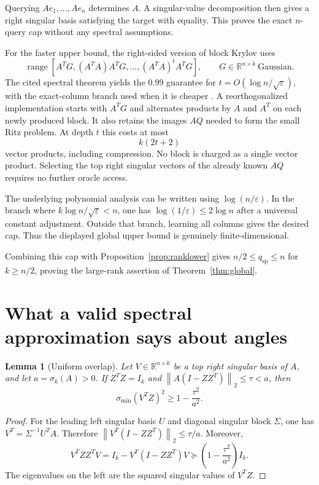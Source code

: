\documentclass[11pt]{article}
\numberwithin{equation}{section}
\newtheorem{lemma}[theorem]{Lemma}
\theoremstyle{definition}
\newcommand{\R}{\mathbb R}
\newcommand{\norm}[1]{\left\lVert#1\right\rVert}
\newcommand{\range}{\operatorname{range}}
\newcommand{\qsp}{q_{\mathrm{sp}}}
\newcommand{\eps}{\varepsilon}
\begin{document}
Querying $Ae_1,\ldots,Ae_n$ determines $A$. A singular-value decomposition
then gives a right singular basis satisfying the target with equality.
This proves the exact $n$-query cap without any spectral assumptions.

For the faster upper bound, the right-sided version of block Krylov uses
\[
 \range\!\left[A^TG,(A^TA)A^TG,\ldots,(A^TA)^tA^TG\right],
 \qquad G\in\R^{n\times k}\ \text{Gaussian}.
\]
The cited spectral theorem yields the $0.99$ guarantee for
$t=O(\log n/\sqrt\eps)$, with the exact-column branch used when it is
cheaper \cite{MM15}. A reorthogonalized implementation starts with $A^TG$
and alternates products by $A$ and $A^T$ on each newly produced block.
It also retains the images $AQ$ needed to form the small Ritz problem.
At depth $t$ this costs at most
\begin{equation}
 k(2t+2)
 \label{eq:uppercount}
\end{equation}
vector products, including compression. No block is charged as a single
vector product. Selecting the top right singular vectors of the already
known $AQ$ requires no further oracle access.

The underlying polynomial analysis can be written using
$\log(n/\eps)$. In the branch where $k\log n/\sqrt\eps<n$, one has
$\log(1/\eps)\le2\log n$ after a universal constant adjustment.
Outside that branch, learning all columns gives the desired cap.
Thus the displayed global upper bound is genuinely finite-dimensional.

Combining this cap with Proposition~\ref{prop:ranklower} gives
$n/2\le\qsp\le n$ for $k\ge n/2$, proving the large-rank assertion of
Theorem~\ref{thm:global}.

\section{What a valid spectral approximation says about angles}
\label{sec:angles}

\begin{lemma}[Uniform overlap]
\label{lem:angle}
Let $V\in\R^{n\times k}$ be a top right singular basis of $A$, and let
$a=\sigma_k(A)>0$. If $Z^TZ=I_k$ and
$\norm{A(I-ZZ^T)}_2\le\tau<a$, then
\begin{equation}
 \sigma_{\min}(V^TZ)^2\ge1-\frac{\tau^2}{a^2}.
 \label{eq:angle}
\end{equation}
\end{lemma}
\begin{proof}
For the leading left singular basis $U$ and diagonal singular block
$\Sigma$, one has $V^T=\Sigma^{-1}U^TA$. Therefore
$\norm{V^T(I-ZZ^T)}_2\le\tau/a$. Moreover,
\[
 V^TZZ^TV=I_k-V^T(I-ZZ^T)V
 \succeq\left(1-\frac{\tau^2}{a^2}\right)I_k.
\]
The eigenvalues on the left are the squared singular values of $V^TZ$.
\end{proof}
\end{document}

